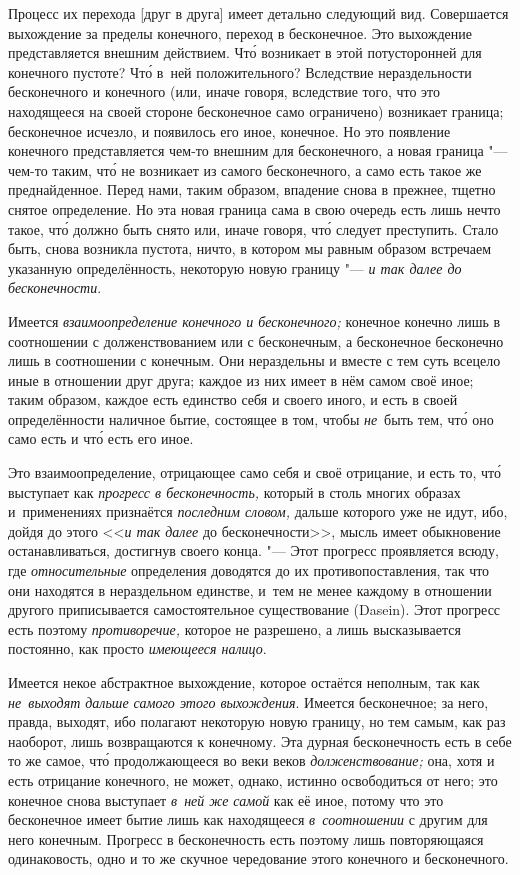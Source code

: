 Процесс их перехода [друг в друга] имеет детально следующий вид. Совершается
выхождение за пределы конечного, переход в бесконечное. Это выхождение
представляется внешним действием. Чт\'{о} возникает в этой потусторонней для
конечного пустоте? Чт\'{о} в~ней положительного? Вследствие нераздельности
бесконечного и конечного (или, иначе говоря, вследствие того, что это
находящееся на своей стороне бесконечное само ограничено) возникает
граница; бесконечное исчезло, и появилось его иное, конечное. Но это
появление конечного представляется чем-то внешним для бесконечного, а
новая граница "--- чем-то таким, чт\'{о} не возникает из самого бесконечного, а
само есть такое же преднайденное. Перед нами, таким образом, впадение снова
в прежнее, тщетно снятое определение. Но эта новая граница сама в свою
очередь есть лишь нечто такое, чт\'{о} должно быть снято или, иначе говоря, чт\'{о}
следует преступить. Стало быть, снова возникла пустота, ничто, в котором мы
равным образом встречаем указанную определённость, некоторую новую границу
"--- {\em и так далее до бесконечности}.

Имеется {\em взаимоопределение конечного и бесконечного;} конечное конечно лишь
в соотношении с долженствованием или с бесконечным, а бесконечное бесконечно
лишь в соотношении с конечным. Они нераздельны и вместе с тем суть всецело иные
в отношении друг друга; каждое из них имеет в нём самом своё иное; таким
образом, каждое есть единство себя и своего иного, и есть в своей
определённости наличное бытие, состоящее в том, чтобы {\em не}~быть тем, чт\'{о}
оно само есть и чт\'{о} есть его иное.

Это взаимоопределение, отрицающее само себя и своё отрицание, и есть то, чт\'{о}
выступает как {\em прогресс в бесконечность,} который в столь многих образах
и~применениях признаётся {\em последним словом,} дальше которого уже не идут,
ибо, дойдя до этого <<{\em и так далее} до бесконечности>>, мысль имеет
обыкновение останавливаться, достигнув своего конца. "--- Этот прогресс
проявляется всюду, где {\em относительные} определения доводятся до их
противопоставления, так что они находятся в нераздельном единстве, и~тем не
менее каждому в отношении другого приписывается самостоятельное существование
(Dasein). Этот прогресс есть поэтому {\em противоречие,} которое не разрешено,
а лишь высказывается постоянно, как просто {\em имеющееся налицо}.

Имеется некое абстрактное выхождение, которое остаётся неполным, так как
{\em не~выходят дальше самого этого выхождения}. Имеется бесконечное; за него,
правда, выходят, ибо полагают некоторую новую границу, но тем самым, как раз
наоборот, лишь возвращаются к конечному. Эта дурная бесконечность есть в себе
то же самое, чт\'{о} продолжающееся во веки веков {\em долженствование;} она, хотя
и есть отрицание конечного, не может, однако, истинно освободиться от него; это
конечное снова выступает {\em в~ней же самой} как её иное, потому что это
бесконечное имеет бытие лишь как находящееся {\em в~соотношении} с другим для
него конечным. Прогресс в бесконечность есть поэтому лишь повторяющаяся
одинаковость, одно и то же скучное чередование этого конечного и бесконечного.

